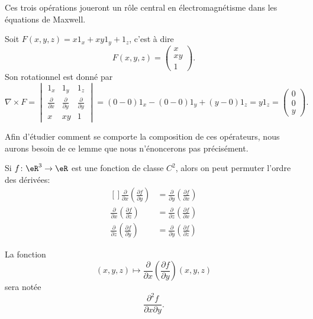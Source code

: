 Ces trois opérations joueront un rôle central en électromagnétisme dans les équations de Maxwell.

\begin{example}
    Soit $F(x,y,z)=x 1_x+xy 1_y+1_z$, c'est à dire
    \begin{equation}
        F(x,y,z)=\begin{pmatrix}
            x    \\ 
            xy    \\ 
            1    
        \end{pmatrix}.
    \end{equation}
    Son rotationnel est donné par
    \begin{equation}
        \nabla\times F=\begin{vmatrix}
            1_x    &   1_y    &   1_z    \\
            \frac{ \partial  }{ \partial x }    &   \frac{ \partial  }{ \partial y }    &   \frac{ \partial  }{ \partial y }    \\
            x    &   xy    &   1
        \end{vmatrix}=
        (0-0)1_x-(0-0)1_y+(y-0)1_z=y1_z=\begin{pmatrix}
            0    \\ 
            0    \\ 
            y    
        \end{pmatrix}.
    \end{equation}
\end{example}

Afin d'étudier comment se comporte la composition de ces opérateurs, nous aurons besoin de ce lemme que nous n'énoncerons pas précisément.
\begin{lemma}       \label{LemPermDerrxyz}
    Si $f\colon \eR^3\to \eR$ est une fonction de classe $C^2$, alors on peut permuter l'ordre des dérivées:
    \begin{equation}
        \begin{aligned}[]
            \frac{ \partial  }{ \partial x }\left( \frac{ \partial f }{ \partial y } \right)&=\frac{ \partial  }{ \partial y }\left( \frac{ \partial f }{ \partial x } \right)\\
            \frac{ \partial  }{ \partial x }\left( \frac{ \partial f }{ \partial z } \right)&=\frac{ \partial  }{ \partial z }\left( \frac{ \partial f }{ \partial x } \right)\\
            \frac{ \partial  }{ \partial z }\left( \frac{ \partial f }{ \partial y } \right)&=\frac{ \partial  }{ \partial y }\left( \frac{ \partial f }{ \partial z } \right)
        \end{aligned}
    \end{equation}
\end{lemma}
La fonction
\begin{equation}
    (x,y,z)\mapsto\frac{ \partial  }{ \partial x }\left( \frac{ \partial f }{ \partial y } \right)(x,y,z)
\end{equation}
sera notée
\begin{equation}
    \frac{ \partial^2f }{ \partial x\partial y }.
\end{equation}

